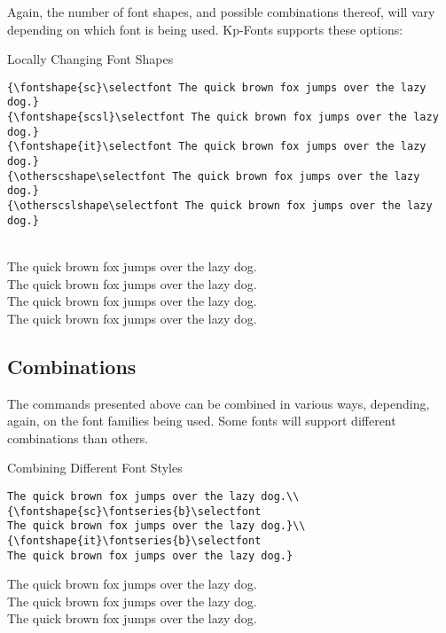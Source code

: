 \documentclass[a4paper,oneside,11pt]{article}
\begin{document}
Again, the number of font shapes, and possible combinations thereof, will vary
depending on which font is being used. Kp-Fonts supports these options:

\begin{titled-frame}
{\textsf{Locally Changing Font Shapes}}
\vspace{-1em}
\small
\begin{verbatim}
{\fontshape{sc}\selectfont The quick brown fox jumps over the lazy dog.}
{\fontshape{scsl}\selectfont The quick brown fox jumps over the lazy dog.}
{\fontshape{it}\selectfont The quick brown fox jumps over the lazy dog.}
{\otherscshape\selectfont The quick brown fox jumps over the lazy dog.}
{\otherscslshape\selectfont The quick brown fox jumps over the lazy dog.}
\end{verbatim}
\normalsize
{}\\
{\selectfont The quick brown fox jumps over the lazy dog.}\\
{\selectfont The quick brown fox jumps over the lazy dog.}\\
{\otherscshape\selectfont The quick brown fox jumps over the lazy dog.}\\
{\otherscslshape\selectfont The quick brown fox jumps over the lazy dog.}\\
\vspace{-1em}
\end{titled-frame}


\subsection{Combinations}
\label{subsec:combinations}

The  commands presented  above can  be  combined in  various ways,  depending,
again,  on the  font families  being used. Some  fonts will  support different
combinations than others.

\begin{titled-frame}
{\textsf{Combining Different Font Styles}}
\vspace{-1em}
\begin{verbatim}
The quick brown fox jumps over the lazy dog.\\
{\fontshape{sc}\fontseries{b}\selectfont
The quick brown fox jumps over the lazy dog.}\\
{\fontshape{it}\fontseries{b}\selectfont
The quick brown fox jumps over the lazy dog.}
\end{verbatim}

\noindent The quick brown fox jumps over the lazy dog.\\
{\selectfont
The quick brown fox jumps over the lazy dog.}\\
{\selectfont
The quick brown fox jumps over the lazy dog.}
\end{titled-frame}
\end{document}
